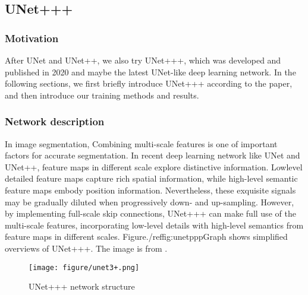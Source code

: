 \subsection{UNet+++}
\subsubsection{Motivation}
After UNet and UNet++, we also try UNet+++\cite{unet_ppp},
which was developed and published in 2020 and maybe the latest UNet-like deep learning network.
In the following sections, we first briefly introduce UNet+++ according to the paper, and then introduce our training methods and results.

\subsubsection{Network description}
In image segmentation, Combining multi-scale features is one of important factors for accurate segmentation.
In recent deep learning network like UNet and UNet++, feature maps in different scale explore distinctive information. Lowlevel detailed feature maps capture rich spatial information, 
while high-level semantic feature maps embody position information. 
Nevertheless, these exquisite signals may be gradually diluted when progressively down- and up-sampling.
However, by implementing full-scale skip connections, UNet+++ can make full use of the multi-scale features, incorporating low-level details with high-level semantics from feature maps in different scales. 
Figure./ref{fig:unetpppGraph} shows simplified overviews of UNet+++. The image is from \cite{unet_ppp}.

\begin{figure}[!htpb]
\texttt{[image: figure/unet3+.png]}
\caption{UNet+++ network structure}
\label{fig:unetpppGraph}
\end{figure}